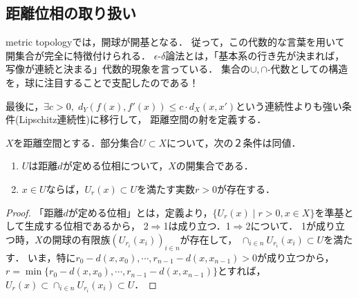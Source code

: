 \documentclass[uplatex,dvipdfmx]{jsreport}
\begin{document}
\subsection{距離位相の取り扱い}

\begin{tcolorbox}[colframe=ForestGreen, colback=ForestGreen!10!white,breakable,colbacktitle=ForestGreen!40!white,coltitle=black,fonttitle=\bfseries\sffamily,
title=]
    metric topologyでは，開球が開基となる．
    従って，この代数的な言葉を用いて開集合が完全に特徴付けられる．
    $\epsilon$-$\delta$論法とは，「基本系の行き先が決まれば，写像が連続と決まる」代数的現象を言っている．
    集合の$\cup,\cap$-代数としての構造を，球に注目することで支配したのである！

    最後に，$\exists c>0,\; d_Y(f(x),f'(x))\le c\cdot d_X(x,x')$という連続性よりも強い条件(Lipschitz連続性)に移行して，
    距離空間の射を定義する．
\end{tcolorbox}

\begin{proposition}\label{prop-open-balls-is-basis}
    $X$を距離空間とする．部分集合$U\subset X$について，次の２条件は同値．
    \begin{enumerate}
        \item $U$は距離$d$が定める位相について，$X$の開集合である．
        \item $x\in U$ならば，$U_r(x)\subset U$を満たす実数$r>0$が存在する．
    \end{enumerate}
\end{proposition}
\begin{proof}
    「距離$d$が定める位相」とは，定義より，$\{U_r(x)\mid r>0,x\in X\}$を準基として生成する位相であるから，
    2$\Rightarrow$1は成り立つ．1$\Rightarrow$2について．
    1が成り立つ時，$X$の開球の有限族$(U_{r_i}(x_i))_{i\in n}$が存在して，
    $\cap_{i\in n}U_{r_i}(x_i)\subset U$を満たす．
    いま，特に$r_0-d(x,x_0),\cdots,r_{n-1}-d(x,x_{n-1})>0$が成り立つから，
    $r=\min\{r_0-d(x,x_0),\cdots,r_{n-1}-d(x,x_{n-1})\}$とすれば，
    $U_r(x)\subset\cap_{i\in n}U_{r_i}(x_i)\subset U$．
\end{proof}
\end{document}
